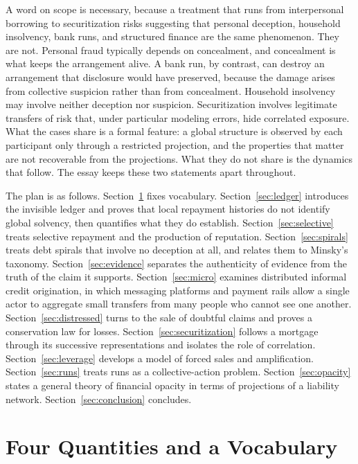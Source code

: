 \documentclass[11pt]{article}
\theoremstyle{definition}
\theoremstyle{remark}
\begin{document}
A word on scope is necessary, because a treatment that runs from interpersonal borrowing to securitization risks suggesting that personal deception, household insolvency, bank runs, and structured finance are the same phenomenon. They are not. Personal fraud typically depends on concealment, and concealment is what keeps the arrangement alive. A bank run, by contrast, can destroy an arrangement that disclosure would have preserved, because the damage arises from collective suspicion rather than from concealment. Household insolvency may involve neither deception nor suspicion. Securitization involves legitimate transfers of risk that, under particular modeling errors, hide correlated exposure. What the cases share is a formal feature: a global structure is observed by each participant only through a restricted projection, and the properties that matter are not recoverable from the projections. What they do not share is the dynamics that follow. The essay keeps these two statements apart throughout.

The plan is as follows. Section~\ref{sec:quantities} fixes vocabulary. Section~\ref{sec:ledger} introduces the invisible ledger and proves that local repayment histories do not identify global solvency, then quantifies what they do establish. Section~\ref{sec:selective} treats selective repayment and the production of reputation. Section~\ref{sec:spirals} treats debt spirals that involve no deception at all, and relates them to Minsky's taxonomy. Section~\ref{sec:evidence} separates the authenticity of evidence from the truth of the claim it supports. Section~\ref{sec:micro} examines distributed informal credit origination, in which messaging platforms and payment rails allow a single actor to aggregate small transfers from many people who cannot see one another. Section~\ref{sec:distressed} turns to the sale of doubtful claims and proves a conservation law for losses. Section~\ref{sec:securitization} follows a mortgage through its successive representations and isolates the role of correlation. Section~\ref{sec:leverage} develops a model of forced sales and amplification. Section~\ref{sec:runs} treats runs as a collective-action problem. Section~\ref{sec:opacity} states a general theory of financial opacity in terms of projections of a liability network. Section~\ref{sec:conclusion} concludes.

\section{Four Quantities and a Vocabulary}\label{sec:quantities}
\end{document}
